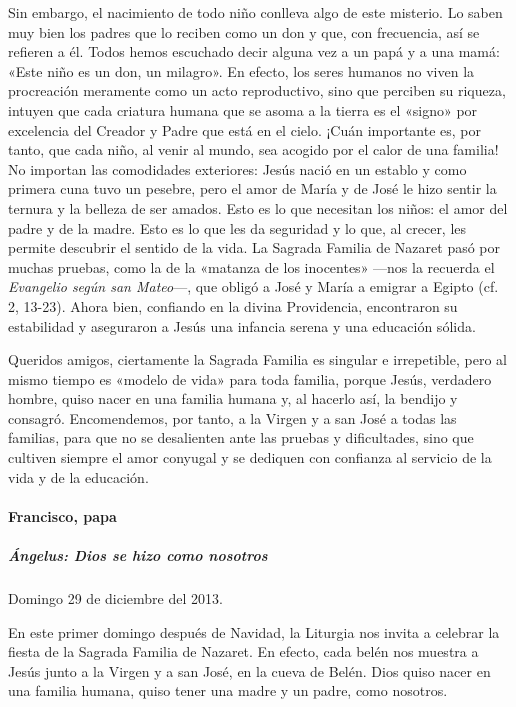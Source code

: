 \documentclass[]{article}
\let\oldparagraph\paragraph
\renewcommand{\paragraph}[1]{\oldparagraph{#1}\mbox{}}
\let\oldsubparagraph\subparagraph
\renewcommand{\subparagraph}[1]{\oldsubparagraph{#1}\mbox{}}
\begin{document}
Sin embargo, el nacimiento de todo niño conlleva algo de este misterio.
Lo saben muy bien los padres que lo reciben como un don y que, con
frecuencia, así se refieren a él. Todos hemos escuchado decir alguna vez
a un papá y a una mamá: «Este niño es un don, un milagro». En efecto,
los seres humanos no viven la procreación meramente como un acto
reproductivo, sino que perciben su riqueza, intuyen que cada criatura
humana que se asoma a la tierra es el «signo» por excelencia del Creador
y Padre que está en el cielo. ¡Cuán importante es, por tanto, que cada
niño, al venir al mundo, sea acogido por el calor de una familia! No
importan las comodidades exteriores: Jesús nació en un establo y como
primera cuna tuvo un pesebre, pero el amor de María y de José le hizo
sentir la ternura y la belleza de ser amados. Esto es lo que necesitan
los niños: el amor del padre y de la madre. Esto es lo que les da
seguridad y lo que, al crecer, les permite descubrir el sentido de la
vida. La Sagrada Familia de Nazaret pasó por muchas pruebas, como la de
la «matanza de los inocentes» ---nos la recuerda el \emph{Evangelio
según san Mateo}---, que obligó a José y María a emigrar a Egipto (cf.
2, 13-23). Ahora bien, confiando en la divina Providencia, encontraron
su estabilidad y aseguraron a Jesús una infancia serena y una educación
sólida.

Queridos amigos, ciertamente la Sagrada Familia es singular e
irrepetible, pero al mismo tiempo es «modelo de vida» para toda familia,
porque Jesús, verdadero hombre, quiso nacer en una familia humana y, al
hacerlo así, la bendijo y consagró. Encomendemos, por tanto, a la Virgen
y a san José a todas las familias, para que no se desalienten ante las
pruebas y dificultades, sino que cultiven siempre el amor conyugal y se
dediquen con confianza al servicio de la vida y de la educación.

\paragraph{Francisco, papa}\label{francisco-papa-5}

\subparagraph{Ángelus: Dios se hizo como
nosotros}\label{uxe1ngelus-dios-se-hizo-como-nosotros}

Domingo 29 de diciembre del 2013.

En este primer domingo después de Navidad, la Liturgia nos invita a
celebrar la fiesta de la Sagrada Familia de Nazaret. En efecto, cada
belén nos muestra a Jesús junto a la Virgen y a san José, en la cueva de
Belén. Dios quiso nacer en una familia humana, quiso tener una madre y
un padre, como nosotros.
\end{document}
